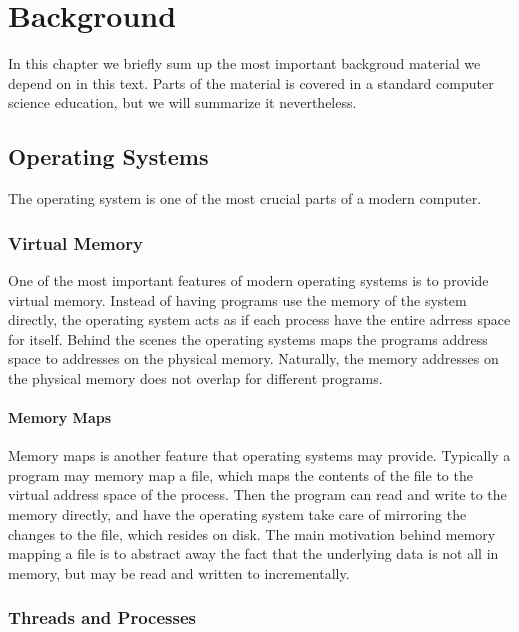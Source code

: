\chapter{Background}

In this chapter we briefly sum up the most important backgroud material we depend on in this text.
Parts of the material is covered in a standard computer science education, but we will summarize it
nevertheless.

\clearpage


\section{Operating Systems}

The operating system is one of the most crucial parts of a modern computer.


\subsection{Virtual Memory}

One of the most important features of modern operating systems is to provide virtual memory.
Instead of having programs use the memory of the system directly, the operating system acts as if
each process have the entire adrress space for itself. Behind the scenes the operating systems maps
the programs address space to addresses on the physical memory. Naturally, the memory addresses on
the physical memory does not overlap for different programs.

\subsubsection{Memory Maps\label{sec:memory-map}}

Memory maps is another feature that operating systems may provide. Typically a program may memory
map a file, which maps the contents of the file to the virtual address space of the process. Then
the program can read and write to the memory directly, and have the operating system take care of
mirroring the changes to the file, which resides on disk.  The main motivation behind memory
mapping a file is to abstract away the fact that the underlying data is not all in memory, but may
be read and written to incrementally.


\subsection{Threads and Processes}

